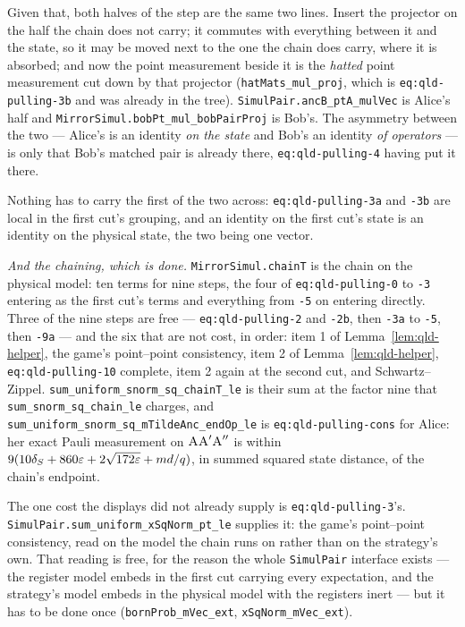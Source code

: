 Given that, both halves of the step are the same two lines. Insert the projector on the half
the chain does not carry; it commutes with everything between it and the state, so it may be
moved next to the one the chain does carry, where it is absorbed; and now the point measurement
beside it is the \emph{hatted} point measurement cut down by that projector
(\texttt{hatMats\_mul\_proj}, which is \texttt{eq:qld-pulling-3b} and was already in the tree).
\texttt{SimulPair.ancB\_ptA\_mulVec} is Alice's half and
\texttt{MirrorSimul.bobPt\_mul\_bobPairProj} is Bob's. The asymmetry between the two --- Alice's
is an identity \emph{on the state} and Bob's an identity \emph{of operators} --- is only that
Bob's matched pair is already there, \texttt{eq:qld-pulling-4} having put it there.

Nothing has to carry the first of the two across: \texttt{eq:qld-pulling-3a} and \texttt{-3b} are
local in the first cut's grouping, and an identity on the first cut's state is an identity on the
physical state, the two being one vector.

\emph{And the chaining, which is done.} \texttt{MirrorSimul.chainT} is the chain on the physical
model: ten terms for nine steps, the four of \texttt{eq:qld-pulling-0} to \texttt{-3} entering as
the first cut's terms and everything from \texttt{-5} on entering directly. Three of the nine steps
are free --- \texttt{eq:qld-pulling-2} and \texttt{-2b}, then \texttt{-3a} to \texttt{-5}, then
\texttt{-9a} --- and the six that are not cost, in order: item 1 of Lemma~\ref{lem:qld-helper}, the
game's point--point consistency, item 2 of Lemma~\ref{lem:qld-helper}, \texttt{eq:qld-pulling-10}
complete, item 2 again at the second cut, and Schwartz--Zippel.
\texttt{sum\_uniform\_snorm\_sq\_chainT\_le} is their sum at the factor nine that
\texttt{sum\_snorm\_sq\_chain\_le} charges, and
\texttt{sum\_uniform\_snorm\_sq\_mTildeAnc\_endOp\_le} is \texttt{eq:qld-pulling-cons} for Alice:
her exact Pauli measurement on $\textsc{A} \textsc{A}' \textsc{A}''$ is within
$9(10 \delta_S + 860 \varepsilon + 2\sqrt{172 \varepsilon} + md/q)$, in summed squared state distance, of the
chain's endpoint.

The one cost the displays did not already supply is \texttt{eq:qld-pulling-3}'s.
\texttt{SimulPair.sum\_uniform\_xSqNorm\_pt\_le} supplies it: the game's point--point
consistency, read on the model the chain runs on rather than on the strategy's own. That reading
is free, for the reason the whole \texttt{SimulPair} interface exists --- the register model
embeds in the first cut carrying every expectation, and the strategy's model embeds in the physical
model with the registers inert --- but it has to be done once (\texttt{bornProb\_mVec\_ext},
\texttt{xSqNorm\_mVec\_ext}).

